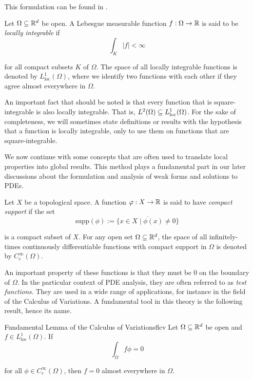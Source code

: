 This formulation can be found in \cite{chepyzhov02}.

\begin{definition}{}{}
    Let $\Omega \subseteq \mathbb{R}^d$ be open. A Lebesgue measurable function $f: \Omega \to \mathbb{R}$ is said to be \emph{locally integrable} if
%
    \begin{equation*}
        \int_K |f| < \infty
    \end{equation*}

    for all compact subsets $K$ of $\Omega$. The space of all locally integrable functions is denoted by $L^1_\text{loc}(\Omega)$, where we identify two functions with each other if they agree almost everywhere in $\Omega$.
\end{definition}

An important fact that should be noted is that every function that is square-integrable is also locally integrable. That is, $L^2(\Omega) \subseteq L^{1}_\text{loc}(\Omega)$. For the sake of completeness, we will sometimes state definitions or results with the hypothesis that a function is locally integrable, only to use them on functions that are square-integrable.

We now continue with some concepts that are often used to translate local properties into global results. This method plays a fundamental part in our later discussions about the formulation and analysis of weak forms and solutions to PDEs.

Let $X$ be a topological space. A function $\varphi: X \to \mathbb{R}$ is said to have \emph{compact support} if the set
%
\begin{equation*}
    \text{supp}(\phi) := \overline{\{ x \in X \mid \phi (x) \neq 0 \}}
\end{equation*}

\noindent
is a compact subset of $X$. For any open set $\Omega \subseteq \mathbb{R}^d$, the space of all infinitely-times continuously differentiable functions with compact support in $\Omega$ is denoted by $C^\infty_c(\Omega)$.

An important property of these functions is that they must be 0 on the boundary of $\Omega$. In the particular context of PDE analysis, they are often referred to as \emph{test functions}. They are used in a wide range of applications, for instance in the field of the Calculus of Variations. A fundamental tool in this theory is the following result, hence its name.

\begin{lemma}{Fundamental Lemma of the Calculus of Variations}{flcv}
    Let $\Omega \subseteq \mathbb{R}^{d}$ be open and $f \in L^{1}_\text{loc}(\Omega)$. If
%
    \begin{equation*}
        \int_{\Omega} f \phi = 0
    \end{equation*}

    for all $\phi \in C^{\infty}_{c}(\Omega)$, then $f = 0$ almost everywhere in $\Omega$.
\end{lemma}

